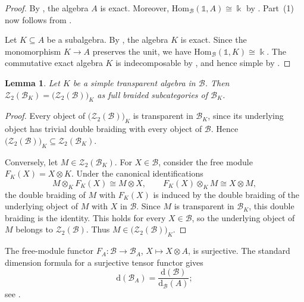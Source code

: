 \documentclass[11pt,reqno]{amsart}
\numberwithin{equation}{section}
\theoremstyle{plain}
\newtheorem{lemma}[thmctr]{Lemma}
\theoremstyle{definition}
\theoremstyle{remark}
\newcommand{\kk}{\Bbbk}
\newcommand{\unit}{\mathds{1}}
\newcommand{\B}{\mathcal{B}}
\newcommand{\Z}{\mathcal{Z}}
\newcommand{\Hom}{\mathrm{Hom}}
\newcommand{\FP}{\mathrm{d}}
\begin{document}
\begin{proof}
By \cite[Theorem~7.1]{coulembier2025simple}, the algebra $A$ is exact.
Moreover, $\Hom_{\B}(\unit,A)\cong\kk$ by
\cite[Lemma~5.9]{shimizu2026commutative}. Part~(1) now follows from
\cite[Theorem~5.5]{shimizu2026commutative}.

Let $K\subseteq A$ be a subalgebra. By
\cite[Proposition~5.6]{ostrik2026non}, the algebra $K$ is exact. Since the
monomorphism $K\to A$ preserves the unit, we have
$\Hom_{\B}(\unit,K)\cong\kk$. The commutative exact algebra $K$ is
indecomposable by \cite[Lemma~5.8]{shimizu2026commutative}, and hence simple
by
\cite[Theorem~7.1]{coulembier2025simple}.
\end{proof}

\begin{lemma}\label{lem:transparent-muger-center}
Let $K$ be a simple transparent algebra in $\B$. Then
$\Z_2(\B_K)=\bigl(\Z_2(\B)\bigr)_K$ as full braided subcategories of
$\B_K$.
\end{lemma}

\begin{proof}
Every object of $\bigl(\Z_2(\B)\bigr)_K$ is transparent in $\B_K$, since
its underlying object has trivial double braiding with every object of
$\B$. Hence
$\bigl(\Z_2(\B)\bigr)_K\subseteq\Z_2(\B_K)$.

Conversely, let $M\in\Z_2(\B_K)$. For $X\in\B$, consider the free module
$F_K(X)=X\otimes K$. Under the canonical identifications
\[
  M\otimes_K F_K(X)\cong M\otimes X,
  \qquad
  F_K(X)\otimes_K M\cong X\otimes M,
\]
the double braiding of $M$ with $F_K(X)$ is induced by the double braiding
of the underlying object of $M$ with $X$ in $\B$. Since $M$ is transparent
in $\B_K$, this double braiding is the identity. This holds for every
$X\in\B$, so the underlying object of $M$ belongs to $\Z_2(\B)$. Thus
$M\in\bigl(\Z_2(\B)\bigr)_K$.
\end{proof}

The free-module functor $F_A:\B\to\B_A$, $X\mapsto X\otimes A$, is
surjective. The standard dimension formula for a surjective tensor functor
gives
\begin{equation}\label{eq:module-category-dimension}
  \FP(\B_A)=\frac{\FP(\B)}{\FP_{\B}(A)};
\end{equation}
see \cite[Lemma~6.2.4]{etingof2016tensor}.

\end{document}
